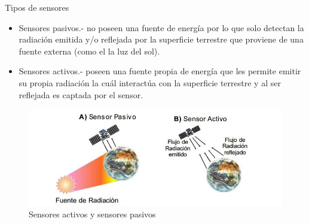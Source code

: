 \begin{frame}{Tipos de sensores}
    \begin{itemize}
        \item Sensores pasivos.- no poseen una fuente de energía por lo que solo detectan la radiación emitida y/o reflejada por la superficie terrestre que proviene de una fuente externa (como el la luz del sol).
        \item Sensores activos.- poseen una fuente propia de energía que les permite emitir su propia radiación la cuál interactúa con la superficie terrestre y al ser reflejada es captada por el sensor.
    \end{itemize}
    
    \begin{figure}
        \centering
        \includegraphics[scale=0.4]{img/section_03/tipos_de_sensores.png}
        \caption{Sensores activos y sensores pasivos \cite{phdthesis}}
        \label{fig:section_03_sensores_activos_pasivos}
    \end{figure}
\end{frame}

